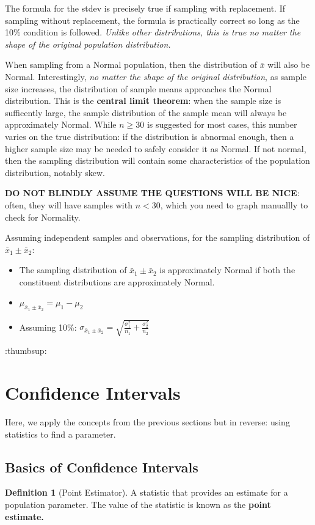 \documentclass[12pt, a4paper]{article}
\theoremstyle{definition}
\newtheorem{definition}{Definition}
\begin{document}
The formula for the stdev is precisely true if sampling with replacement.
If sampling without replacement, the formula is practically correct so long as the 10\% condition is followed.
\textit{Unlike other distributions, this is true no matter the shape of the original population distribution.}

When sampling from a Normal population, then the distribution of $\bar{x}$ will also be Normal.
Interestingly, \textit{no matter the shape of the original distribution}, as sample size increases, the distribution of sample means approaches the Normal distribution.
This is the \textbf{central limit theorem}: when the sample size is sufficently large, the sample distribution of the sample mean will always be approximately Normal.
While $n \geq 30$ is suggested for most cases, this number varies on the true distribution: if the distribution is abnormal enough, then a higher sample size may be needed to safely consider it as Normal.
If not normal, then the sampling distribution will contain some characteristics of the population distribution, notably skew.

\textbf{DO NOT BLINDLY ASSUME THE QUESTIONS WILL BE NICE}: often, they will have samples with $n < 30$, which you need to graph manuallly to check for Normality.

Assuming independent samples and observations, for the sampling distribution of $\bar{x}_1 \pm \bar{x}_2$:
\begin{itemize}
    \item The sampling distribution of $\bar{x}_1 \pm \bar{x}_2$ is approximately Normal if both the constituent distributions are approximately Normal.
    \item $\mu_{\bar{x}_1 \pm \bar{x}_2} = \mu_1 - \mu_2$
    \item Assuming 10\%: $\sigma_{\bar{x}_1 \pm \bar{x}_2} = \sqrt{\frac{\sigma_1^2}{n_1} + \frac{\sigma_2^2}{n_2}}$
\end{itemize}

:thumbsup:

\newpage

\section{Confidence Intervals}
Here, we apply the concepts from the previous sections but in reverse: using statistics to find a parameter.

\subsection{Basics of Confidence Intervals}
\begin{definition}[Point Estimator]
    A statistic that provides an estimate for a population parameter.
    The value of the statistic is known as the \textbf{point estimate.}
\end{definition}
\end{document}
